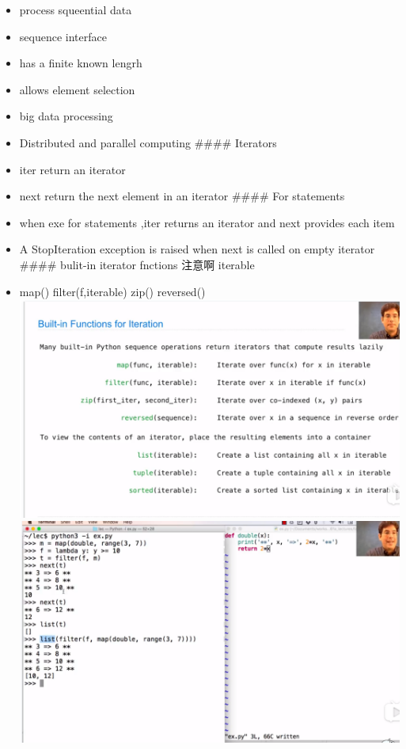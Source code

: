 \documentclass[11pt]{article}
\makeatletter
\def\maxwidth{\ifdim\Gin@nat@width>\linewidth\linewidth
    \else\Gin@nat@width\fi}
\let\Oldincludegraphics\includegraphics
\renewcommand{\includegraphics}[1]{\Oldincludegraphics[width=.8\maxwidth]{#1}}
\providecommand{\tightlist}{%
      \setlength{\itemsep}{0pt}\setlength{\parskip}{0pt}}
\makeatother
\begin{document}
\begin{itemize}
\tightlist
\item
  process squeential data
\item
  sequence interface
\item
  has a finite known lengrh
\item
  allows element selection
\item
  big data processing
\item
  Distributed and parallel computing \#\#\#\# Iterators
\item
  iter return an iterator
\item
  next return the next element in an iterator \#\#\#\# For statements
\item
  when exe for statements ,iter returns an iterator and next provides
  each item
\item
  A StopIteration exception is raised when next is called on empty
  iterator \#\#\#\# bulit-in iterator fnctions 注意啊 iterable
\item
  map() filter(f,iterable) zip() reversed()
  \includegraphics{./image/built-in-iterator.png}
  \includegraphics{./image/bulit-in-iter-function.png}
\end{itemize}
\end{document}
